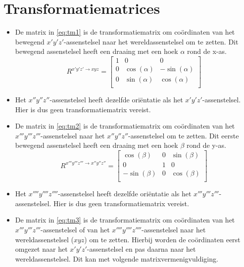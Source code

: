 \section{Transformatiematrices}
\begin{itemize}
\item De matrix in \eqref{eq:tm1} is de transformatiematrix om coördinaten van het bewegend $x'y'z'$-assenstelsel naar het wereldassenstelsel om te zetten. Dit bewegend assenstelsel heeft een draaing met een hoek $\alpha$ rond de x-as.
\begin{equation}
R^{x'y'z' \rightarrow xyz}=
\begin{bmatrix}
1			&			0			&			0		   \\
0			&\cos(\alpha)&-\sin(\alpha)\\
0			&\sin(\alpha)&\cos(\alpha) \\
\end{bmatrix}
\label{eq:tm1}
\end{equation}
\item Het $x''y''z''$-assenstelsel heeft dezelfde oriëntatie als het $x'y'z'$-assenstelsel. Hier is dus geen transformatiematrix vereist.
\item De matrix in \eqref{eq:tm2} is de transformatiematrix om coördinaten van het $x'''y'''z'''$-assenstelsel naar het $x''y''z''$-assenstelsel om te zetten. Dit eerste bewegend assenstelsel heeft een draaing met een hoek $\beta$ rond de y-as.
\begin{equation}
R^{x'''y'''z''' \rightarrow x''y''z''}=
\begin{bmatrix}
\cos(\beta)	&			0			&\sin(\beta)\\
0						&			1			&			0		 \\
-\sin(\beta)&			0			&\cos(\beta)\\
\end{bmatrix}
\label{eq:tm2}
\end{equation}
\item Het $x''''y''''z''''$-assenstelsel heeft dezelfde oriëntatie als het $x'''y'''z'''$-assenstelsel. Hier is dus geen transformatiematrix vereist.
\item De matrix in \eqref{eq:tm3} is de transformatiematrix om coördinaten van het $x'''y'''z'''$-assenstelsel of van het $x''''y''''z''''$-assenstelsel naar het wereldassenstelsel ($xyz$) om te zetten. Hierbij worden de coördinaten eerst omgezet naar het $x'y'z'$-assenstelsel en pas daarna naar het wereldassenstelsel. Dit kan met volgende matrixvermenigvuldiging.
\begin{equation}

\end{equation}
\end{itemize}

